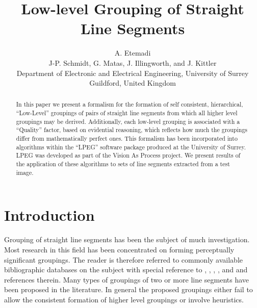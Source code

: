 \setlength{\unitlength}{1mm}

\title{\vspace{-3pc}\titlesize\bf Low-level Grouping of Straight Line Segments}

\author{\large A. Etemadi\\ 
\large J-P. Schmidt, G. Matas, J. Illingworth, and J. Kittler\\ 
\normalsize Department of Electronic and Electrical Engineering, University of Surrey\\ \normalsize Guildford, United Kingdom \date{}}

\maketitle

\begin{abstract}\ninesize 
\noindent  In this paper we present a formalism for the formation of self 
consistent, hierarchical, ``Low-Level'' groupings of pairs of straight line 
segments from which all higher level groupings may be derived. Additionally, 
each low-level grouping is associated with a ``Quality'' factor, based on 
evidential reasoning, which reflects how much the groupings differ from 
mathematically perfect ones. This formalism has been incorporated into 
algorithms within the ``LPEG'' software package produced at the University of 
Surrey. LPEG was developed as part of the Vision As Process \cite{crowley89} 
project. We present results of the application of these algorithms to sets of 
line segments extracted from a test image. 

\end{abstract}

\section{Introduction}

 Grouping of straight line segments has been the subject of much 
investigation. Most research in this field has been concentrated on forming 
perceptually significant groupings. The reader is 
therefore referred to commonly available bibliographic databases on the 
subject with special reference to \cite{weiss86}, \cite{lowe87}, 
\cite{mohan89}, \cite{horaud90}, and \cite{faugeras90} and references 
therein. Many types of groupings of two or more line segments have been 
proposed in the literature. In general the proposed groupings either fail to 
allow the consistent formation of higher level groupings or involve 
heuristics. 

